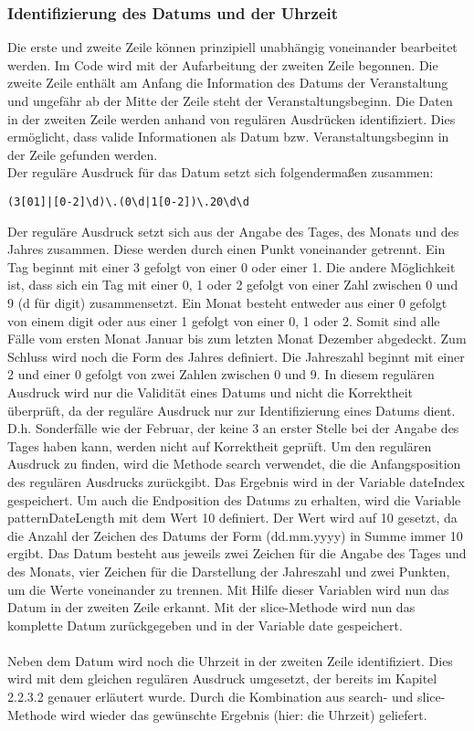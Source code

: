 \subsubsection{Identifizierung des Datums und der Uhrzeit}
Die erste und zweite Zeile können prinzipiell unabhängig voneinander bearbeitet werden. Im Code wird mit der Aufarbeitung der zweiten Zeile begonnen. Die zweite Zeile enthält am Anfang die Information des Datums der Veranstaltung und ungefähr ab der Mitte der Zeile steht der Veranstaltungsbeginn. Die Daten in der zweiten Zeile werden anhand von regulären Ausdrücken identifiziert. Dies ermöglicht, dass valide Informationen als Datum bzw. Veranstaltungsbeginn in der Zeile gefunden werden.\\
Der reguläre Ausdruck für das Datum setzt sich folgendermaßen zusammen:
\begin{verbatim}
(3[01]|[0-2]\d)\.(0\d|1[0-2])\.20\d\d
\end{verbatim}
Der reguläre Ausdruck setzt sich aus der Angabe des Tages, des Monats und des Jahres zusammen. Diese werden durch einen Punkt voneinander getrennt. Ein Tag beginnt mit einer 3 gefolgt von einer 0 oder einer 1. Die andere Möglichkeit ist, dass sich ein Tag mit einer 0, 1 oder 2 gefolgt von einer Zahl zwischen 0 und 9 (d für digit) zusammensetzt. Ein Monat besteht entweder aus einer 0 gefolgt von einem digit oder aus einer 1 gefolgt von einer 0, 1 oder 2. Somit sind alle Fälle vom ersten Monat Januar bis zum letzten Monat Dezember abgedeckt. Zum Schluss wird noch die Form des Jahres definiert. Die Jahreszahl beginnt mit einer 2 und einer 0 gefolgt von zwei Zahlen zwischen 0 und 9. 
In diesem regulären Ausdruck wird nur die Validität eines Datums und nicht die Korrektheit überprüft, da der reguläre Ausdruck nur zur Identifizierung eines Datums dient. D.h. Sonderfälle wie der Februar, der keine 3 an erster Stelle bei der Angabe des Tages haben kann, werden nicht auf Korrektheit geprüft.
Um den regulären Ausdruck zu finden, wird die Methode search verwendet, die die Anfangsposition des regulären Ausdrucks zurückgibt. Das Ergebnis wird in der Variable dateIndex gespeichert. Um auch die Endposition des Datums zu erhalten, wird die Variable patternDateLength mit dem Wert 10 definiert. Der Wert wird auf 10 gesetzt, da die Anzahl der Zeichen des Datums der Form (dd.mm.yyyy) in Summe immer 10 ergibt. Das Datum besteht aus jeweils zwei Zeichen für die Angabe des Tages und des Monats, vier Zeichen für die Darstellung der Jahreszahl und zwei Punkten, um die Werte voneinander zu trennen. Mit Hilfe dieser Variablen wird nun das Datum in der zweiten Zeile erkannt. Mit der slice-Methode wird nun das komplette Datum zurückgegeben und in der Variable date gespeichert.\\
\\
Neben dem Datum wird noch die Uhrzeit in der zweiten Zeile identifiziert. Dies wird mit dem gleichen regulären Ausdruck umgesetzt, der bereits im Kapitel 2.2.3.2 genauer erläutert wurde. Durch die Kombination aus search- und slice-Methode wird wieder das gewünschte Ergebnis (hier: die Uhrzeit) geliefert. 

